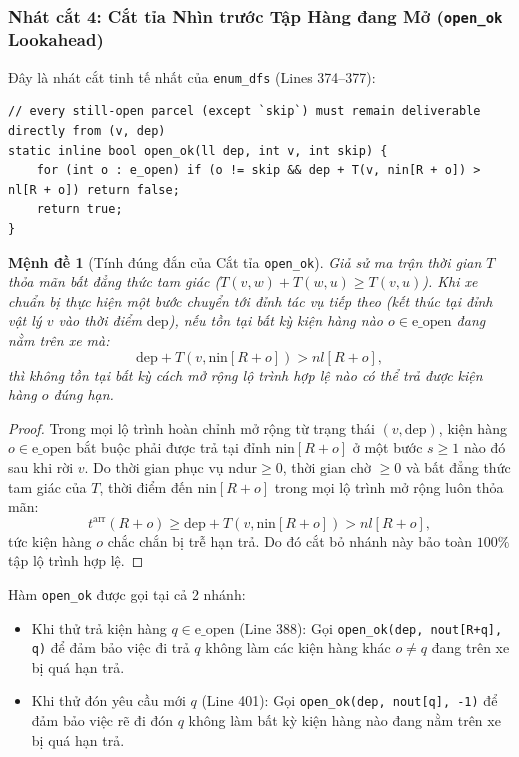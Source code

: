 \documentclass[11pt,a4paper]{article}
\newtheorem{proposition}[theorem]{Mệnh đề}
\theoremstyle{definition}
\begin{document}
\subsubsection{Nhát cắt 4: Cắt tỉa Nhìn trước Tập Hàng đang Mở (\texttt{open\_ok} Lookahead)}
Đây là nhát cắt tinh tế nhất của \texttt{enum\_dfs} (Lines 374--377):
\begin{lstlisting}
// every still-open parcel (except `skip`) must remain deliverable directly from (v, dep)
static inline bool open_ok(ll dep, int v, int skip) {
    for (int o : e_open) if (o != skip && dep + T(v, nin[R + o]) > nl[R + o]) return false;
    return true;
}
\end{lstlisting}

\begin{proposition}[Tính đúng đắn của Cắt tỉa \texttt{open\_ok}]
Giả sử ma trận thời gian $T$ thỏa mãn bất đẳng thức tam giác ($T(v, w) + T(w, u) \ge T(v, u)$). Khi xe chuẩn bị thực hiện một bước chuyển tới đỉnh tác vụ tiếp theo (kết thúc tại đỉnh vật lý $v$ vào thời điểm $\text{dep}$), nếu tồn tại bất kỳ kiện hàng nào $o \in \text{e\_open}$ đang nằm trên xe mà:
\begin{equation}
    \text{dep} + T(v, \text{nin}[R+o]) > nl[R+o],
    \label{eq:open_ok}
\end{equation}
thì không tồn tại bất kỳ cách mở rộng lộ trình hợp lệ nào có thể trả được kiện hàng $o$ đúng hạn.
\end{proposition}
\begin{proof}
Trong mọi lộ trình hoàn chỉnh mở rộng từ trạng thái $(v, \text{dep})$, kiện hàng $o \in \text{e\_open}$ bắt buộc phải được trả tại đỉnh $\text{nin}[R+o]$ ở một bước $s \ge 1$ nào đó sau khi rời $v$. Do thời gian phục vụ $\text{ndur} \ge 0$, thời gian chờ $\ge 0$ và bất đẳng thức tam giác của $T$, thời điểm đến $\text{nin}[R+o]$ trong mọi lộ trình mở rộng luôn thỏa mãn:
\[
    t^{\text{arr}}(R+o) \ge \text{dep} + T(v, \text{nin}[R+o]) > nl[R+o],
\]
tức kiện hàng $o$ chắc chắn bị trễ hạn trả. Do đó cắt bỏ nhánh này bảo toàn $100\%$ tập lộ trình hợp lệ.
\end{proof}
Hàm \texttt{open\_ok} được gọi tại cả 2 nhánh:
\begin{itemize}[leftmargin=1.5em]
    \item Khi thử trả kiện hàng $q \in \text{e\_open}$ (Line 388): Gọi \texttt{open\_ok(dep, nout[R+q], q)} để đảm bảo việc đi trả $q$ không làm các kiện hàng khác $o \neq q$ đang trên xe bị quá hạn trả.
    \item Khi thử đón yêu cầu mới $q$ (Line 401): Gọi \texttt{open\_ok(dep, nout[q], -1)} để đảm bảo việc rẽ đi đón $q$ không làm bất kỳ kiện hàng nào đang nằm trên xe bị quá hạn trả.
\end{itemize}
\end{document}
